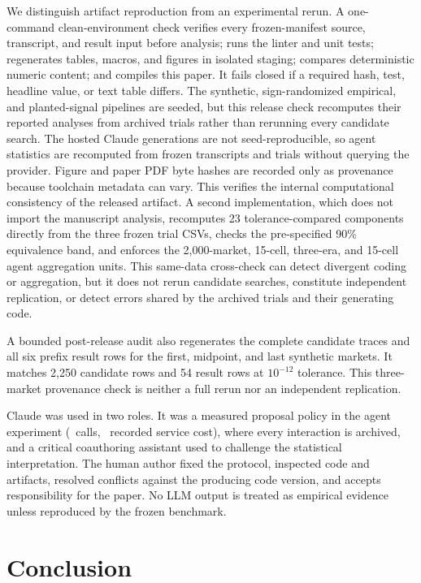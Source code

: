 \documentclass[sigconf,nonacm]{acmart}
\begin{document}
We distinguish artifact reproduction from an experimental rerun. A one-command
clean-environment check verifies every frozen-manifest source, transcript, and
result input before analysis; runs the linter and unit tests; regenerates tables,
macros, and figures in isolated staging; compares deterministic numeric content;
and compiles this paper. It fails closed if a required hash, test, headline value,
or text table differs. The synthetic, sign-randomized empirical, and
planted-signal pipelines are seeded, but this release check recomputes their
reported analyses from archived trials rather than rerunning every candidate
search. The hosted Claude generations are not seed-reproducible, so agent
statistics are recomputed from frozen transcripts and trials without querying
the provider. Figure and paper PDF byte hashes are recorded only as provenance
because toolchain metadata can vary. This verifies the internal computational
consistency of the released artifact. A second implementation, which does not
import the manuscript analysis, recomputes 23 tolerance-compared components
directly from the three frozen trial CSVs, checks the pre-specified 90\%
equivalence band, and enforces the 2,000-market, 15-cell, three-era, and 15-cell
agent aggregation units. This same-data cross-check can
detect divergent coding or aggregation, but it does not rerun candidate
searches, constitute independent replication, or detect errors shared by the
archived trials and their generating code.

A bounded post-release audit also regenerates the complete candidate traces and
all six prefix result rows for the first, midpoint, and last synthetic markets.
It matches 2,250 candidate rows and 54 result rows at $10^{-12}$ tolerance. This
three-market provenance check is neither a full rerun nor an independent
replication.

Claude was used in two roles. It was a measured proposal policy in the agent
experiment (\AgentCalls\ calls, \AgentCost\ recorded service cost), where every
interaction is archived, and a critical coauthoring
assistant used to challenge the statistical interpretation. The human author
fixed the protocol, inspected code and artifacts, resolved conflicts against
the producing code version, and accepts responsibility for the paper. No LLM
output is treated as empirical evidence unless reproduced by the frozen
benchmark.

\section{Conclusion}
\end{document}
